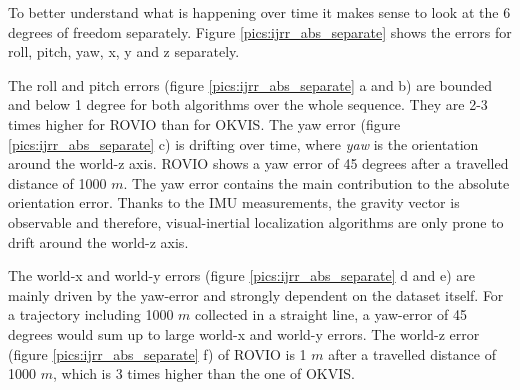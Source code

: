 To better understand what is happening over time it makes sense to look at the 6 degrees of freedom separately. Figure \ref{pics:ijrr_abs_separate} shows the errors for roll, pitch, yaw, x, y and z separately.

The roll and pitch errors (figure \ref{pics:ijrr_abs_separate} a and b) are bounded and below 1 degree for both algorithms over the whole sequence. They are 2-3 times higher for ROVIO than for OKVIS. The yaw error (figure \ref{pics:ijrr_abs_separate} c) is drifting over time, where \textit{yaw} is the orientation around the world-z axis. ROVIO shows a yaw error of 45 degrees after a travelled distance of 1000 $m$. The yaw error contains the main contribution to the absolute orientation error. Thanks to the IMU measurements, the gravity vector is observable and therefore, visual-inertial localization algorithms are only prone to drift around the world-z axis. 

The world-x and world-y errors (figure \ref{pics:ijrr_abs_separate} d and e) are mainly driven by the yaw-error and strongly dependent on the dataset itself. For a trajectory including 1000 $m$ collected in a straight line, a yaw-error of 45 degrees would sum up to large world-x and world-y errors. The world-z error (figure \ref{pics:ijrr_abs_separate} f) of ROVIO is 1 $m$ after a travelled distance of 1000 $m$, which is 3 times higher than the one of OKVIS. \\

